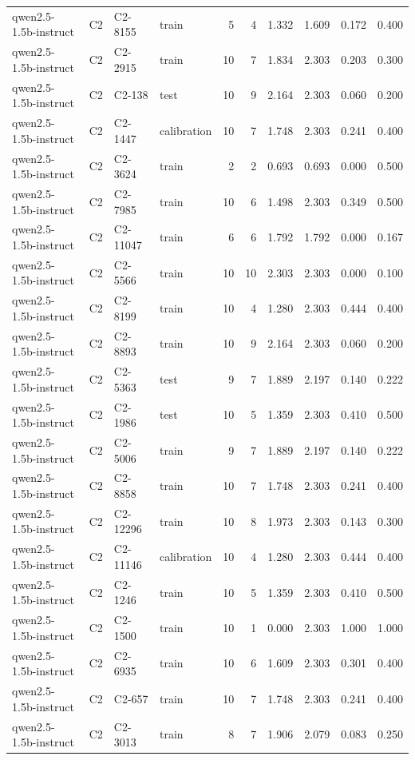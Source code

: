 \begin{table}
\begin{tabular}{llllrrrrrr}
qwen2.5-1.5b-instruct & C2 & C2-8155 & train & 5 & 4 & 1.332 & 1.609 & 0.172 & 0.400 \\
qwen2.5-1.5b-instruct & C2 & C2-2915 & train & 10 & 7 & 1.834 & 2.303 & 0.203 & 0.300 \\
qwen2.5-1.5b-instruct & C2 & C2-138 & test & 10 & 9 & 2.164 & 2.303 & 0.060 & 0.200 \\
qwen2.5-1.5b-instruct & C2 & C2-1447 & calibration & 10 & 7 & 1.748 & 2.303 & 0.241 & 0.400 \\
qwen2.5-1.5b-instruct & C2 & C2-3624 & train & 2 & 2 & 0.693 & 0.693 & 0.000 & 0.500 \\
qwen2.5-1.5b-instruct & C2 & C2-7985 & train & 10 & 6 & 1.498 & 2.303 & 0.349 & 0.500 \\
qwen2.5-1.5b-instruct & C2 & C2-11047 & train & 6 & 6 & 1.792 & 1.792 & 0.000 & 0.167 \\
qwen2.5-1.5b-instruct & C2 & C2-5566 & train & 10 & 10 & 2.303 & 2.303 & 0.000 & 0.100 \\
qwen2.5-1.5b-instruct & C2 & C2-8199 & train & 10 & 4 & 1.280 & 2.303 & 0.444 & 0.400 \\
qwen2.5-1.5b-instruct & C2 & C2-8893 & train & 10 & 9 & 2.164 & 2.303 & 0.060 & 0.200 \\
qwen2.5-1.5b-instruct & C2 & C2-5363 & test & 9 & 7 & 1.889 & 2.197 & 0.140 & 0.222 \\
qwen2.5-1.5b-instruct & C2 & C2-1986 & test & 10 & 5 & 1.359 & 2.303 & 0.410 & 0.500 \\
qwen2.5-1.5b-instruct & C2 & C2-5006 & train & 9 & 7 & 1.889 & 2.197 & 0.140 & 0.222 \\
qwen2.5-1.5b-instruct & C2 & C2-8858 & train & 10 & 7 & 1.748 & 2.303 & 0.241 & 0.400 \\
qwen2.5-1.5b-instruct & C2 & C2-12296 & train & 10 & 8 & 1.973 & 2.303 & 0.143 & 0.300 \\
qwen2.5-1.5b-instruct & C2 & C2-11146 & calibration & 10 & 4 & 1.280 & 2.303 & 0.444 & 0.400 \\
qwen2.5-1.5b-instruct & C2 & C2-1246 & train & 10 & 5 & 1.359 & 2.303 & 0.410 & 0.500 \\
qwen2.5-1.5b-instruct & C2 & C2-1500 & train & 10 & 1 & 0.000 & 2.303 & 1.000 & 1.000 \\
qwen2.5-1.5b-instruct & C2 & C2-6935 & train & 10 & 6 & 1.609 & 2.303 & 0.301 & 0.400 \\
qwen2.5-1.5b-instruct & C2 & C2-657 & train & 10 & 7 & 1.748 & 2.303 & 0.241 & 0.400 \\
qwen2.5-1.5b-instruct & C2 & C2-3013 & train & 8 & 7 & 1.906 & 2.079 & 0.083 & 0.250 \\

\end{tabular}
\end{table}
